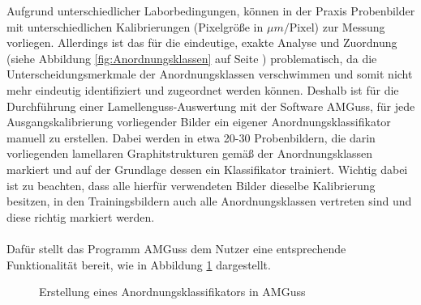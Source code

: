\documentclass[
fontsize=10pt, 
listof = totoc,
parskip = half	
]{report}
\begin{document}
\noindent Aufgrund unterschiedlicher Laborbedingungen, können in der Praxis Probenbilder mit unterschiedlichen Kalibrierungen (Pixelgröße in $\mu m/\text{Pixel}$) zur Messung vorliegen. Allerdings ist das für die eindeutige, exakte Analyse und Zuordnung (siehe Abbildung \ref{fig:Anordnungsklassen} auf Seite \pageref{fig:Anordnungsklassen}) problematisch, da die Unterscheidungsmerkmale der Anordnungsklassen verschwimmen und somit nicht mehr eindeutig identifiziert und zugeordnet werden können. Deshalb ist für die Durchführung einer Lamellenguss-Auswertung mit der Software AMGuss, für jede Ausgangskalibrierung vorliegender Bilder ein eigener Anordnungsklassifikator manuell zu erstellen. Dabei werden in etwa 20-30 Probenbildern, die darin vorliegenden lamellaren Graphitstrukturen gemäß der Anordnungsklassen markiert und auf der Grundlage dessen ein Klassifikator trainiert. Wichtig dabei ist zu beachten, dass alle hierfür verwendeten Bilder dieselbe Kalibrierung besitzen, in den Trainingsbildern auch alle Anordnungsklassen vertreten sind und diese richtig markiert werden.
\\\\
Dafür stellt das Programm AMGuss dem Nutzer eine entsprechende Funktionalität bereit, wie in Abbildung \ref{fig:ErstAnordnungsklass} dargestellt.


\begin{figure}[H]
	\centering
	\caption{Erstellung eines Anordnungsklassifikators in AMGuss}
	\label{fig:ErstAnordnungsklass}
\end{figure}
\end{document}
